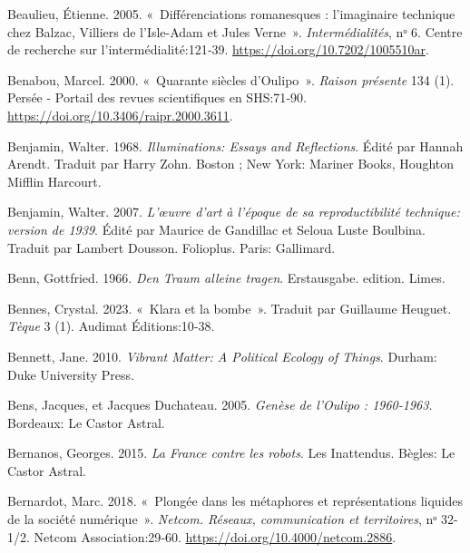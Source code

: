 \begin{CSLReferences}{1}{0}
\leavevmode{}%
Beaulieu, Étienne. 2005. {«~{Diff{é}renciations romanesques :
l'imaginaire technique chez Balzac, Villiers de l'Isle-Adam et Jules
Verne}~»}. \emph{Interm{é}dialit{é}s}, nᵒ 6. {Centre de recherche sur
l'interm{é}dialit{é}}:121‑39. \url{https://doi.org/10.7202/1005510ar}.

\leavevmode{}%
Benabou, Marcel. 2000. {«~{Quarante si{è}cles d'Oulipo}~»}. \emph{Raison
pr{é}sente} 134 (1). {Pers{é}e - Portail des revues scientifiques en
SHS}:71‑90. \url{https://doi.org/10.3406/raipr.2000.3611}.

\leavevmode{}%
Benjamin, Walter. 1968. \emph{Illuminations: {Essays} and
{Reflections}}. Édité par Hannah Arendt. Traduit par Harry Zohn. {Boston
; New York}: {Mariner Books, Houghton Mifflin Harcourt}.

\leavevmode{}%
Benjamin, Walter. 2007. \emph{{L'{œ}uvre d'art {à} l'{é}poque de sa
reproductibilit{é} technique: version de 1939}}. Édité par Maurice de
Gandillac et Seloua Luste Boulbina. Traduit par Lambert Dousson.
{Folioplus}. {Paris}: {Gallimard}.

\leavevmode{}%
Benn, Gottfried. 1966. \emph{{Den Traum alleine tragen}}. Erstausgabe.
edition. {Limes}.

\leavevmode{}%
Bennes, Crystal. 2023. {«~{Klara et la bombe}~»}. Traduit par Guillaume
Heuguet. \emph{T{è}que} 3 (1). {Audimat {É}ditions}:10‑38.

\leavevmode{}%
Bennett, Jane. 2010. \emph{Vibrant {Matter}: A {Political Ecology} of
{Things}}. {Durham}: {Duke University Press}.

\leavevmode{}%
Bens, Jacques, et Jacques Duchateau. 2005. \emph{Gen{è}se de l'{Oulipo}
: 1960-1963}. {Bordeaux}: {Le Castor Astral}.

\leavevmode{}%
Bernanos, Georges. 2015. \emph{{La France contre les robots}}. {Les
Inattendus}. {B{è}gles}: {Le Castor Astral}.

\leavevmode{}%
Bernardot, Marc. 2018. {«~{Plong{é}e dans les m{é}taphores et
repr{é}sentations liquides de la soci{é}t{é} num{é}rique}~»}.
\emph{Netcom. R{é}seaux, communication et territoires}, nᵒ 32-1/2.
{Netcom Association}:29‑60. \url{https://doi.org/10.4000/netcom.2886}.


\end{CSLReferences}
